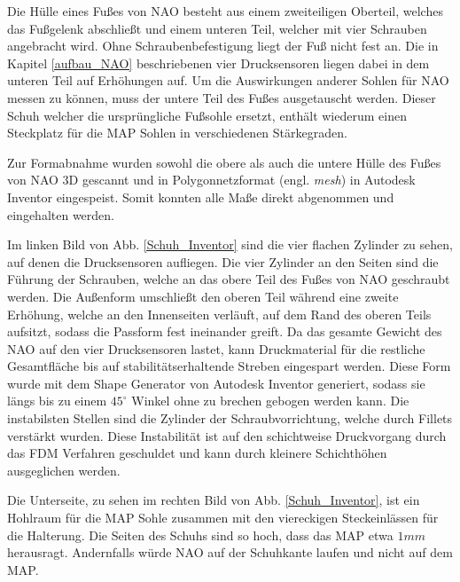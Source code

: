 Die Hülle eines Fußes von NAO besteht aus einem zweiteiligen Oberteil, welches das Fußgelenk abschließt und einem unteren Teil, welcher mit vier Schrauben angebracht wird. Ohne Schraubenbefestigung liegt der Fuß nicht fest an. Die in Kapitel \ref{aufbau_NAO} beschriebenen vier Drucksensoren liegen dabei in dem unteren Teil auf Erhöhungen auf. Um die Auswirkungen anderer Sohlen für NAO messen zu können, muss der untere Teil des Fußes ausgetauscht werden. Dieser \glqq Schuh\grqq{} welcher die ursprüngliche Fußsohle ersetzt, enthält wiederum einen Steckplatz für die MAP Sohlen in verschiedenen Stärkegraden. 

Zur Formabnahme wurden sowohl die obere als auch die untere Hülle des Fußes von NAO 3D gescannt und in Polygonnetzformat (engl. \textit{mesh}) in Autodesk Inventor eingespeist. Somit konnten alle Maße direkt abgenommen und eingehalten werden. 

Im linken Bild von Abb. \ref{Schuh_Inventor} sind die vier flachen Zylinder zu sehen, auf denen die Drucksensoren aufliegen. Die vier Zylinder an den Seiten sind die Führung der Schrauben, welche an das obere Teil des Fußes von NAO geschraubt werden. Die Außenform umschließt den oberen Teil während eine zweite Erhöhung, welche an den Innenseiten verläuft, auf dem Rand des oberen Teils aufsitzt, sodass die Passform fest ineinander greift. Da das gesamte Gewicht des NAO auf den vier Drucksensoren lastet, kann Druckmaterial für die restliche Gesamtfläche bis auf stabilitätserhaltende Streben eingespart werden. Diese Form wurde mit dem Shape Generator von Autodesk Inventor generiert, sodass sie längs bis zu einem $45^\circ$ Winkel ohne zu brechen gebogen werden kann. Die instabilsten Stellen sind die Zylinder der Schraubvorrichtung, welche durch Fillets verstärkt wurden. Diese Instabilität ist auf den schichtweise Druckvorgang durch das FDM Verfahren geschuldet und kann durch kleinere Schichthöhen ausgeglichen werden.

Die Unterseite, zu sehen im rechten Bild von Abb. \ref{Schuh_Inventor}, ist ein Hohlraum für die MAP Sohle zusammen mit den viereckigen Steckeinlässen für die Halterung. Die Seiten des Schuhs sind so hoch, dass das MAP etwa $1 \unit{mm}$ herausragt. Andernfalls würde NAO auf der Schuhkante laufen und nicht auf dem MAP.  

